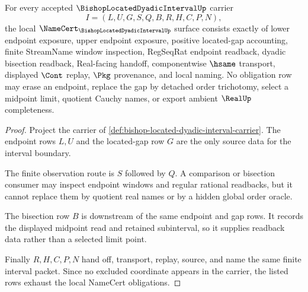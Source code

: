 \begin{theorem}
\label{thm:bishop-located-dyadic-interval-namecert-obligations}
For every accepted $\BishopLocatedDyadicIntervalUp$ carrier
$$
I=(L,U,G,S,Q,B,R,H,C,P,N),
$$
the local $\NameCert_{\BishopLocatedDyadicIntervalUp}$ surface consists exactly of lower endpoint exposure, upper endpoint exposure, positive located-gap accounting, finite StreamName window inspection, RegSeqRat endpoint readback, dyadic bisection readback, Real-facing handoff, componentwise $\hsame$ transport, displayed $\Cont$ replay, $\Pkg$ provenance, and local naming. No obligation row may erase an endpoint, replace the gap by detached order trichotomy, select a midpoint limit, quotient Cauchy names, or export ambient $\RealUp$ completeness.
\end{theorem}
\begin{proof}
Project the carrier of \autoref{def:bishop-located-dyadic-interval-carrier}. The endpoint rows $L,U$ and the located-gap row $G$ are the only source data for the interval boundary.

The finite observation route is $S$ followed by $Q$. A comparison or bisection consumer may inspect endpoint windows and regular rational readbacks, but it cannot replace them by quotient real names or by a hidden global order oracle.

The bisection row $B$ is downstream of the same endpoint and gap rows. It records the displayed midpoint read and retained subinterval, so it supplies readback data rather than a selected limit point.

Finally $R,H,C,P,N$ hand off, transport, replay, source, and name the same finite interval packet. Since no excluded coordinate appears in the carrier, the listed rows exhaust the local NameCert obligations.
\end{proof}

